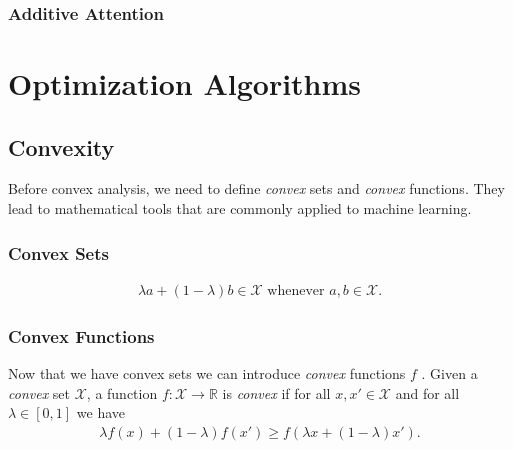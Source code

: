 \documentclass[a4paper,12pt]{article}
\theoremstyle{definition}
\begin{document}
\subsubsection*{Additive Attention}


\section{Optimization Algorithms}

\subsection*{Convexity}
Before convex analysis, we need to define \emph{convex} sets and \emph{convex} functions. They lead to mathematical tools that are commonly applied to machine learning.

\subsubsection*{Convex Sets}
\begin{equation*}
    \begin{aligned}
        \lambda  a + (1-\lambda)  b \in \mathcal{X} \text{ whenever } a, b \in \mathcal{X}.
    \end{aligned}
\end{equation*}

\subsubsection*{Convex Functions}

Now that we have convex sets we can introduce \emph{convex} functions $f$ . Given a \emph{convex} set $\mathcal{X}$, a function $f: \mathcal{X} \to \mathbb{R}$ is \emph{convex} if for all
$x, x' \in \mathcal{X}$ and for all $\lambda \in [0, 1]$ we have
\begin{equation*}
    \begin{aligned}
        \lambda f(x) + (1-\lambda) f(x') \geq f(\lambda x + (1-\lambda) x').
    \end{aligned}
\end{equation*}
\end{document}
